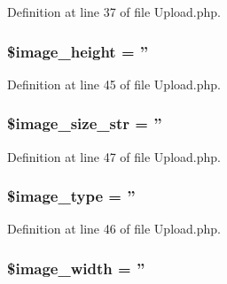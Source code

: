 Definition at line 37 of file Upload.\-php.

\hypertarget{class_c_i___upload_af1b0485025a4c66fa3b2fc442df02d72}{
\subsubsection[{\$image\-\_\-height}]{\setlength{\rightskip}{0pt plus 5cm}\$image\-\_\-height = ''}}\label{class_c_i___upload_af1b0485025a4c66fa3b2fc442df02d72}


Definition at line 45 of file Upload.\-php.

\hypertarget{class_c_i___upload_a3a1769072af8ab3b0c5d6e0c1a1ae2ef}{
\subsubsection[{\$image\-\_\-size\-\_\-str}]{\setlength{\rightskip}{0pt plus 5cm}\$image\-\_\-size\-\_\-str = ''}}\label{class_c_i___upload_a3a1769072af8ab3b0c5d6e0c1a1ae2ef}


Definition at line 47 of file Upload.\-php.

\hypertarget{class_c_i___upload_a939d6733d998cce893403d2f59f40317}{
\subsubsection[{\$image\-\_\-type}]{\setlength{\rightskip}{0pt plus 5cm}\$image\-\_\-type = ''}}\label{class_c_i___upload_a939d6733d998cce893403d2f59f40317}


Definition at line 46 of file Upload.\-php.

\hypertarget{class_c_i___upload_a8dadc2d2dcc0f25529a2d1e080d08169}{
\subsubsection[{\$image\-\_\-width}]{\setlength{\rightskip}{0pt plus 5cm}\$image\-\_\-width = ''}}\label{class_c_i___upload_a8dadc2d2dcc0f25529a2d1e080d08169}


